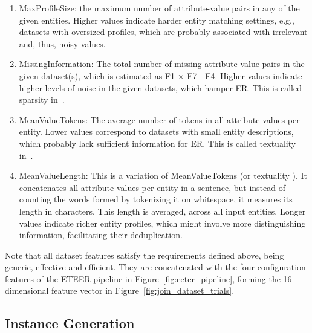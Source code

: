 \begin{enumerate}[leftmargin=*, label=F\arabic*), start=1]
    \item MaxProfileSize: the maximum number of attribute-value pairs in any of the given entities. Higher values indicate harder entity matching settings, e.g., datasets with oversized profiles, which are probably associated with irrelevant and, thus, noisy values. 
    \item MissingInformation: The total number of missing attribute-value pairs in the given dataset(s), which is estimated as F1 $\times$ F7 - F4. Higher values indicate higher levels of noise in the given datasets, which hamper ER. This is called sparsity in~\cite{DBLP:conf/cikm/PrimpeliB20}.
    \item MeanValueTokens: The average number of tokens in all attribute values per entity. Lower values correspond to datasets with small entity descriptions, which probably lack sufficient information for ER. This is called textuality in~\cite{DBLP:conf/cikm/PrimpeliB20}.
    \item MeanValueLength: This is a variation of MeanValueTokens (or textuality \cite{DBLP:conf/cikm/PrimpeliB20}). It concatenates all attribute values per entity in a sentence, but instead of counting the words formed by tokenizing it on whitespace, it measures its length in characters. This length is averaged, across all input entities. Longer values indicate richer entity profiles, which might involve more distinguishing information, facilitating their deduplication.
\end{enumerate}

Note that all dataset features satisfy the requirements defined above, being generic, effective and efficient. They are concatenated with the four configuration features of the ETEER pipeline in Figure~\ref{fig:eeter_pipeline}, forming the 16-dimensional feature vector in Figure~\ref{fig:join_dataset_trials}.


\subsection{Instance Generation}
\label{sec:instanceGeneration}


